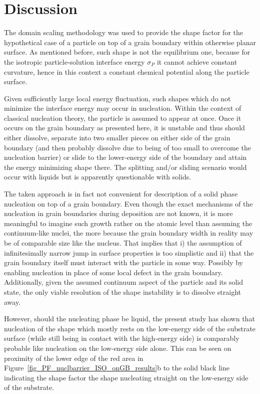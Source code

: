 \section{Discussion}
The domain scaling methodology was used to provide the shape factor for the hypothetical case of a particle on top of a grain boundary within otherwise planar surface. As mentioned before, such shape is not the equilibrium one, because for the isotropic particle-solution interface energy $\sigma_P$ it cannot achieve constant curvature, hence in this context a constant chemical potential along the particle surface. 

Given sufficiently large local energy fluctuation, such shapes which do not minimize the interface energy may occur in nucleation. Within the context of classical nucleation theory, the particle is assumed to appear at once. Once it occurs on the grain boundary as presented here, it is unstable and thus should either dissolve, separate into two smaller pieces on either side of the grain boundary (and then probably dissolve due to being of too small to overcome the nucleation barrier) or slide to the lower-energy side of the boundary and attain the energy minimizing shape there. The splitting and/or sliding scenario would occur with liquids but is apparently questionable with solids.

The taken approach is in fact not convenient for description of a solid phase nucleation on top of a grain boundary. Even though the exact mechanisms of the nucleation in grain boundaries during deposition are not known, it is more meaningful to imagine such growth rather on the atomic level than assuming the continuum-like nuclei, the more because the grain boundary width in reality may be of comparable size like the nucleus. That implies that i) the assumption of infinitesimally narrow jump in surface properties is too simplistic and ii) that the grain boundary itself must interact with the particle in some way. Possibly by enabling nucleation in place of some local defect in the grain boundary. Additionally, given the assumed continuum aspect of the particle and its solid state, the only viable resolution of the shape instability is to dissolve straight away.

However, should the nucleating phase be liquid, the present study has shown that nucleation of the shape which mostly rests on the low-energy side of the substrate surface (while still being in contact with the high-energy side) is comparably probable like nucleation on the low-energy side alone. This can be seen on proximity of the lower edge of the red area in Figure~\ref{fig_PF_nuclbarrier_ISO_onGB_results}b to the solid black line indicating the shape factor the shape nucleating straight on the low-energy side of the substrate. 

